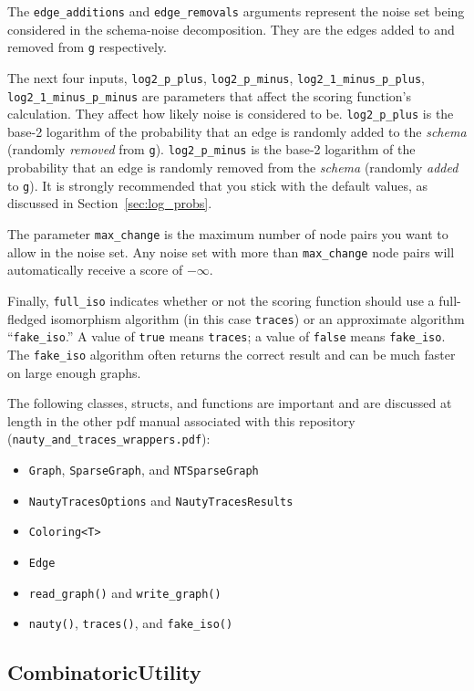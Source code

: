 \documentclass{article}
\begin{document}
The \verb|edge_additions| and \verb|edge_removals| arguments represent the noise set being considered in the schema-noise decomposition. They are the edges added to and removed from \verb|g| respectively.

The next four inputs, \verb|log2_p_plus|, \verb|log2_p_minus|, \verb|log2_1_minus_p_plus|, \verb|log2_1_minus_p_minus| are parameters that affect the scoring function's calculation. They affect how likely noise is considered to be. \verb|log2_p_plus| is the base-2 logarithm of the probability that an edge is randomly added to the \emph{schema} (randomly \emph{removed} from \verb|g|). \verb|log2_p_minus| is the base-2 logarithm of the probability that an edge is randomly removed from the \emph{schema} (randomly \emph{added} to \verb|g|). It is strongly recommended that you stick with the default values, as discussed in Section~\ref{sec:log_probs}.

The parameter \verb|max_change| is the maximum number of node pairs you want to allow in the noise set. Any noise set with more than \verb|max_change| node pairs will automatically receive a score of $-\infty$.

Finally, \verb|full_iso| indicates whether or not the scoring function should use a full-fledged isomorphism algorithm (in this case \verb|traces|) or an approximate algorithm ``\verb|fake_iso|.'' A value of \verb|true| means \verb|traces|; a value of \verb|false| means \verb|fake_iso|. The \verb|fake_iso| algorithm often returns the correct result and can be much faster on large enough graphs.

The following classes, structs, and functions are important and are discussed at length in the other pdf manual associated with this repository (\verb|nauty_and_traces_wrappers.pdf|):

\begin{itemize}
    \item \verb|Graph|, \verb|SparseGraph|, and \verb|NTSparseGraph|
    \item \verb|NautyTracesOptions| and \verb|NautyTracesResults|
    \item \verb|Coloring<T>|
    \item \verb|Edge|
    \item \verb|read_graph()| and \verb|write_graph()|
    \item \verb|nauty()|, \verb|traces()|, and \verb|fake_iso()|
\end{itemize}

\subsection{CombinatoricUtility}\label{sec:comb_util}
\end{document}
